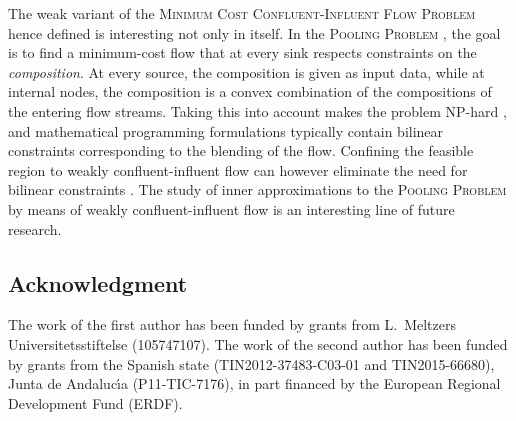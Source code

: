 \documentclass[pdflatex,sn-mathphys-num]{sn-jnl}%
\theoremstyle{thmstyleone}%
\begin{document}
The weak variant of the \textsc{Minimum Cost Confluent-Influent Flow Problem} hence defined is interesting not only in itself.
In the \textsc{Pooling Problem} \cite{haverly78}, the goal is to find a minimum-cost flow that at every sink respects constraints on the \emph{composition}.
At every source, the composition is given as input data, while at internal nodes, the composition is a convex combination of the compositions of the entering flow streams.
Taking this into account makes the problem NP-hard \cite{alfaki13}, and mathematical programming formulations typically contain bilinear constraints corresponding to the blending of the flow.
Confining the feasible region to weakly confluent-influent flow can however eliminate the need for bilinear constraints \cite{gestsson26}.
The study of inner approximations to the \textsc{Pooling Problem} by means of weakly confluent-influent flow is an interesting line of future research.

\subsection*{Acknowledgment}
\small{The work of the first author has been funded by grants from L.\ Meltzers Universitetsstiftelse (105747107).}
\small{The work of the second author has been funded by grants from the Spanish state (TIN2012-37483-C03-01 and TIN2015-66680), Junta de Andaluc\'{\i}a (P11-TIC-7176),
in part financed by the European Regional Development Fund (ERDF).}

% 

\end{document}
